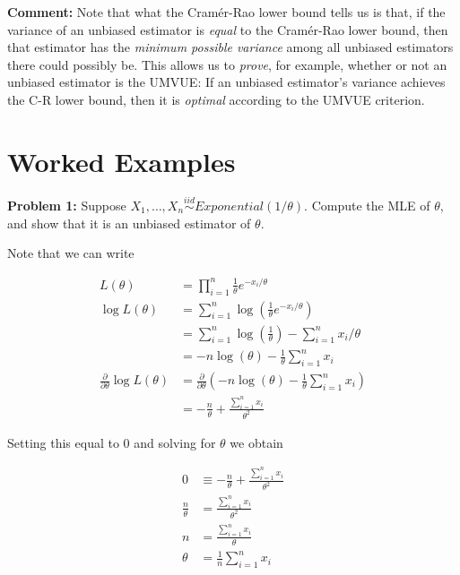\documentclass[
  letterpaper,
  DIV=11,
  numbers=noendperiod]{scrreprt}
\begin{document}
\textbf{Comment:} Note that what the Cramér-Rao lower bound tells us is
that, if the variance of an unbiased estimator is \emph{equal} to the
Cramér-Rao lower bound, then that estimator has the \emph{minimum
possible variance} among all unbiased estimators there could possibly
be. This allows us to \emph{prove}, for example, whether or not an
unbiased estimator is the UMVUE: If an unbiased estimator's variance
achieves the C-R lower bound, then it is \emph{optimal} according to the
UMVUE criterion.

\hypertarget{worked-examples-3}{%
\section{Worked Examples}\label{worked-examples-3}}

\textbf{Problem 1:} Suppose
\(X_1, \dots, X_n \overset{iid}{\sim} Exponential(1/\theta)\). Compute
the MLE of \(\theta\), and show that it is an unbiased estimator of
\(\theta\).

Note that we can write

\begin{align*}
    L(\theta) & = \prod_{i = 1}^n \frac{1}{\theta} e^{-x_i / \theta} \\
    \log L(\theta) & = \sum_{i = 1}^n \log(\frac{1}{\theta} e^{-x_i / \theta}) \\
    & = \sum_{i = 1}^n  \log(\frac{1}{\theta}) - \sum_{i = 1}^n x_i / \theta \\
    & = -n \log(\theta) - \frac{1}{\theta} \sum_{i = 1}^n x_i \\
    \frac{\partial}{\partial \theta} \log L(\theta) & = \frac{\partial}{\partial \theta}  \left( -n \log(\theta) - \frac{1}{\theta} \sum_{i = 1}^n x_i \right) \\
    & = -\frac{n}{\theta} + \frac{\sum_{i = 1}^n x_i }{\theta^2} 
\end{align*}

Setting this equal to \(0\) and solving for \(\theta\) we obtain

\begin{align*}
    0 & \equiv -\frac{n}{\theta} + \frac{\sum_{i = 1}^n x_i }{\theta^2}  \\
    \frac{n}{\theta} & = \frac{\sum_{i = 1}^n x_i }{\theta^2} \\
    n & = \frac{\sum_{i = 1}^n x_i }{\theta} \\
    \theta & = \frac{1}{n} \sum_{i = 1}^n x_i
\end{align*}
\end{document}

